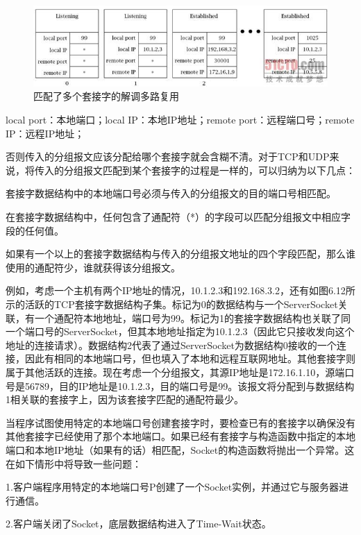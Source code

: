 		\clearpage

	\begin{figure}[htbp]%
		\centering
		\includegraphics[scale=.6]{img/06.12.jpg}
		\caption{匹配了多个套接字的解调多路复用}
		\label{fig:match.muti.socket.ru}
	\end{figure}

	local port：本地端口；local IP：本地IP地址；remote port：远程端口号；remote IP：远程IP地址；

	否则传入的分组报文应该分配给哪个套接字就会含糊不清。对于TCP和UDP来说，将传入的分组报文匹配到某个套接字的过程是一样的，可以归纳为以下几点：

	套接字数据结构中的本地端口号必须与传入的分组报文的目的端口号相匹配。

	在套接字数据结构中，任何包含了通配符（*）的字段可以匹配分组报文中相应字段的任何值。

	如果有一个以上的套接字数据结构与传入的分组报文地址的四个字段匹配，那么谁使用的通配符少，谁就获得该分组报文。

	例如，考虑一个主机有两个IP地址的情况，10.1.2.3和192.168.3.2，还有如图6.12所示的活跃的TCP套接字数据结构子集。标记为0的数据结构与一个ServerSocket关联，有一个通配符本地地址，端口号为99。标记为1的套接字数据结构也关联了同一个端口号的ServerSocket，但其本地地址指定为10.1.2.3（因此它只接收发向这个地址的连接请求）。数据结构2代表了通过ServerSocket为数据结构0接收的一个连接，因此有相同的本地端口号，但也填入了本地和远程互联网地址。其他套接字则属于其他活跃的连接。现在考虑一个分组报文，其源IP地址是172.16.1.10，源端口号是56789，目的IP地址是10.1.2.3，目的端口号是99。该报文将分配到与数据结构1相关联的套接字上，因为该套接字匹配的通配符最少。

	当程序试图使用特定的本地端口号创建套接字时，要检查已有的套接字以确保没有其他套接字已经使用了那个本地端口。如果已经有套接字与构造函数中指定的本地端口和本地IP地址（如果有的话）相匹配，Socket的构造函数将抛出一个异常。这在如下情形中将导致一些问题：

	1.客户端程序用特定的本地端口号P创建了一个Socket实例，并通过它与服务器进行通信。

	2.客户端关闭了Socket，底层数据结构进入了Time-Wait状态。

